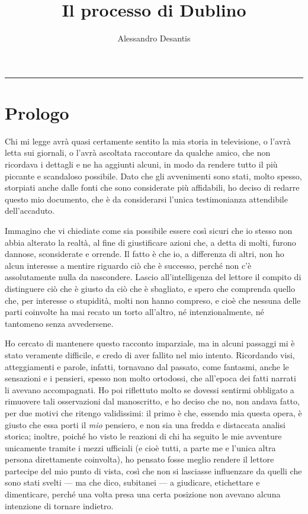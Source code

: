 \documentclass[a4paper,11pt,oneside,openright,final]{memoir}
\title{Il processo di Dublino}
\author{Alessandro Desantis}
\makeatletter
\renewcommand{\maketitle}{\begin{titlingpage}%
    \let\footnotesize\small
    \let\footnoterule\relax
    \parindent \z@
    \reset@font
    \null\vfil
    \begin{flushleft}
      \huge \@title
    \end{flushleft}
    \par
    \hrule height 1pt
    \par
    \begin{flushright}
      \LARGE \@author \par
    \end{flushright}
    \vskip 60\p@
    \vfil\null
  \end{titlingpage}%
  \setcounter{footnote}{0}%
}
\makeatother
\begin{document}
\maketitle

\frontmatter

\chapter{Prologo}
Chi mi legge avrà quasi certamente sentito la mia storia in televisione, o
l'avrà letta sui giornali, o l'avrà ascoltata raccontare da qualche amico, che
non ricordava i dettagli e ne ha aggiunti alcuni, in modo da rendere tutto il
più piccante e scandaloso possibile. Dato che gli avvenimenti sono stati, molto
spesso, storpiati anche dalle fonti che sono considerate più affidabili, ho
deciso di redarre questo mio documento, che è da considerarsi l'unica
testimonianza attendibile dell'accaduto.

Immagino che vi chiediate come sia possibile essere così sicuri che io stesso
non abbia alterato la realtà, al fine di giustificare azioni che, a detta di
molti, furono dannose, sconsiderate e orrende. Il fatto è che io, a differenza
di altri, non ho alcun interesse a mentire riguardo ciò che è successo, perché
non c'è assolutamente nulla da nascondere. Lascio all'intelligenza del lettore
il compito di distinguere ciò che è giusto da ciò che è sbagliato, e spero che
comprenda quello che, per interesse o stupidità, molti non hanno compreso, e
cioè che nessuna delle parti coinvolte ha mai recato un torto all'altro, né
intenzionalmente, né tantomeno senza avvedersene.

Ho cercato di mantenere questo racconto imparziale, ma in alcuni passaggi mi è
stato veramente difficile, e credo di aver fallito nel mio intento. Ricordando
visi, atteggiamenti e parole, infatti, tornavano dal passato, come fantasmi,
anche le sensazioni e i pensieri, spesso non molto ortodossi, che all'epoca dei
fatti narrati li avevano accompagnati. Ho poi riflettuto molto se dovessi
sentirmi obbligato a rimuovere tali osservazioni dal manoscritto, e ho deciso
che no, non andava fatto, per due motivi che ritengo validissimi: il primo è
che, essendo mia questa opera, è giusto che essa porti il \emph{mio} pensiero, e
non sia una fredda e distaccata analisi storica; inoltre, poiché ho visto le
reazioni di chi ha seguito le mie avventure unicamente tramite i mezzi ufficiali
(e cioè tutti, a parte me e l'unica altra persona direttamente coinvolta), ho
pensato fosse meglio rendere il lettore partecipe del mio punto di vista, così
che non si lasciasse influenzare da quelli che sono stati svelti --- ma che
dico, subitanei --- a giudicare, etichettare e dimenticare, perché una volta
presa una certa posizione non avevano alcuna intenzione di tornare indietro.
\end{document}
